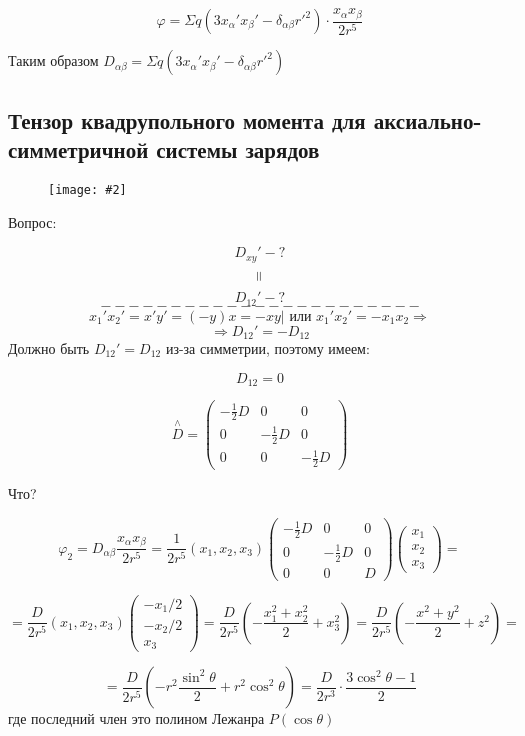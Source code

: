 \documentclass[a4paper,12pt]{article}
\newcommand{\fc}[1]{\[#1\]}
\newcommand{\imc}[2][0.7\textwidth]{%
    \begin{figure}[h!]
        \centering
        \texttt{[image: \#2]}
    \end{figure}%
}
\begin{document}
\fc{\varphi=\Sigma q(3x_{\alpha}'x_{\beta}'-\delta_{\alpha\beta}r'^2)\cdot\frac{x_{\alpha}x_{\beta}}{2r^5}}

Таким образом $D_{\alpha\beta}=\Sigma q(3x_{\alpha}'x_{\beta}'-\delta_{\alpha\beta}r'^2)$

\newpage

\subsection*{Тензор квадрупольного момента для аксиально-симметричной системы зарядов}

\imc[0.4\textwidth]{22.png}

Вопрос:

\fc{D_{xy}'-?}
\fc{\rotatebox{90}{=}}
\fc{D_{12}'-?}
\fc{-----------------------}
\fc{x_1'x_2'=x'y'=(-y)x=-xy|\text{ или }x_1'x_2'=-x_1x_2\Rightarrow}
\fc{\Rightarrow D_{12}'=-D_{12}}
Должно быть $D_{12}'=D_{12}$ из-за симметрии, поэтому имеем:

\fc{D_{12}=0}

\fc{\overset{\wedge}{D}=\begin{pmatrix}
-\frac{1}{2}D & 0 & 0 \\
0 & -\frac{1}{2}D & 0 \\
0 & 0 & -\frac{1}{2}D
\end{pmatrix}}

Что?

\fc{\varphi_2=D_{\alpha\beta}\frac{x_{\alpha}x_{\beta}}{2r^5}=\frac{1}{2r^5}(x_1,x_2,x_3)
\begin{pmatrix}
-\frac{1}{2}D & 0 & 0 \\
0 & -\frac{1}{2}D & 0 \\
0 & 0 & D
\end{pmatrix}
\begin{pmatrix}
x_1 \\
x_2 \\
x_3
\end{pmatrix}=
}

\fc{=\frac{D}{2r^5}(x_1,x_2,x_3)
\begin{pmatrix}
-x_1/2 \\
-x_2/2 \\
x_3
\end{pmatrix}=
\frac{D}{2r^5}\left(-\frac{x_1^2+x_2^2}{2}+x_3^2 \right)
=\frac{D}{2r^5}\left(-\frac{x^2+y^2}{2}+z^2 \right)=
}

\fc{=\frac{D}{2r^5}\left(-r^2\frac{\sin^2\theta}{2}+r^2\cos^2\theta \right)=\frac{D}{2r^3}\cdot\frac{3\cos^2\theta-1}{2}}
где последний член это полином Лежанра $P(\cos \theta)$
\end{document}
